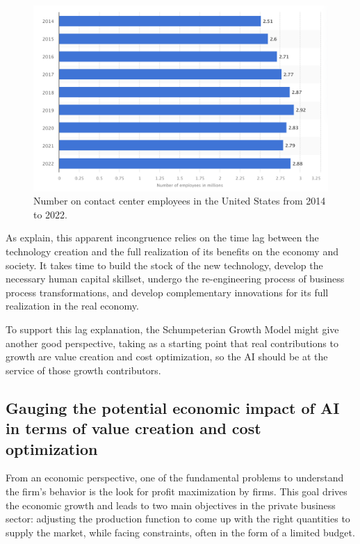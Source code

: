 \documentclass[preprint, 3p,
authoryear]{elsarticle} %
\begin{document}
\begin{figure}

{\centering \includegraphics[width=0.7\linewidth]{../Views/contact_center_employees_US} 

}

\caption{\label{fig1}Number on contact center employees in the United States from 2014 to 2022.}\label{fig:fig1}
\end{figure}

As \citep{paradox} explain, this apparent incongruence relies on the
time lag between the technology creation and the full realization of its
benefits on the economy and society. It takes time to build the stock of
the new technology, develop the necessary human capital skillset,
undergo the re-engineering process of business process transformations,
and develop complementary innovations for its full realization in the
real economy.

To support this lag explanation, the Schumpeterian Growth Model might
give another good perspective, taking as a starting point that real
contributions to growth are value creation and cost optimization, so the
AI should be at the service of those growth contributors.

\hypertarget{gauging-the-potential-economic-impact-of-ai-in-terms-of-value-creation-and-cost-optimization}{%
\subsection{Gauging the potential economic impact of AI in terms of
value creation and cost
optimization}\label{gauging-the-potential-economic-impact-of-ai-in-terms-of-value-creation-and-cost-optimization}}

From an economic perspective, one of the fundamental problems to
understand the firm's behavior is the look for profit maximization by
firms. This goal drives the economic growth and leads to two main
objectives in the private business sector: adjusting the production
function to come up with the right quantities to supply the market,
while facing constraints, often in the form of a limited budget.
\end{document}
